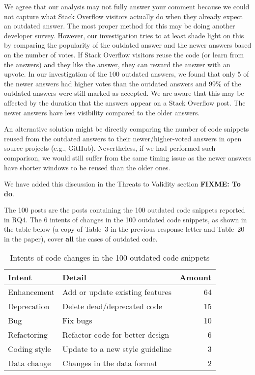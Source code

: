 \documentclass[a4paper,twoside,10pt]{reviewresponse}
\newcommand\FIXME[1]{{\color{red}\textbf{FIXME: #1}}}
\begin{document}
We agree that our analysis may not fully answer your comment because we could not capture what Stack Overflow visitors actually do when they already expect an outdated answer. The most proper method for this may be doing another developer survey. However, our investigation tries to at least shade light on this by comparing the popularity of the outdated answer and the newer answers based on the number of votes. If Stack Overflow visitors reuse the code (or learn from the answers) and they like the answer, they can reward the answer with an upvote. In our investigation of the 100 outdated answers, we found that only 5 of the newer answers had higher votes than the outdated answers and 99\% of the outdated answers were still marked as accepted. We are aware that this may be affected by the duration that the answers appear on a Stack Overflow post. The newer answers have less visibility compared to the older answers. 

An alternative solution might be directly comparing the number of code snippets reused from the outdated answers to their newer/higher-voted answers in open source projects (e.g., GitHub). 
Nevertheless, if we had performed such comparison, we would still suffer from the same timing issue as the newer answers have shorter windows to be reused than the older ones.

We have added this discussion in the Threats to Validity section \FIXME{To do}.


The 100 posts are the posts containing the 100 outdated code snippets reported in RQ4. The 6 intents of changes in the 100 outdated code snippets, as shown in the table below (a copy of Table~3 in the previous response letter and Table~20 in the paper), cover \textbf{all} the cases of outdated code. 

\begin{table}[H]
	\centering
	\begin{tabular}{llr}
		\toprule
		Intent & Detail & Amount \\
		\midrule
		Enhancement & Add or update existing features & 64 \\
		Deprecation & Delete dead/deprecated code & 15 \\
		Bug & Fix bugs & 10 \\
		Refactoring & Refactor code for better design & 6 \\
		Coding style & Update to a new style guideline & 3 \\
		Data change & Changes in the data format & 2 \\
		\bottomrule
	\end{tabular}
	\label{tab:intent_outdated}
	\caption{Intents of code changes in the 100 outdated code snippets}
\end{table}
\end{document}

